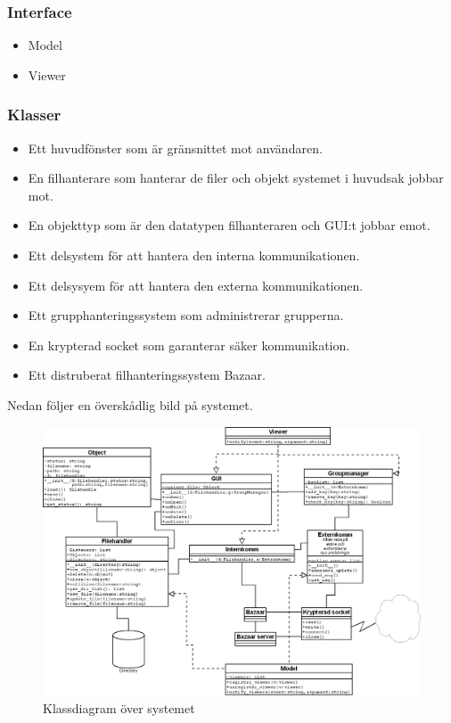 \subsubsection{Interface}
\begin{itemize}
\item Model
\item Viewer
\end{itemize}
\subsubsection{Klasser}
\begin{itemize}
\item Ett huvudfönster som är gränsnittet mot användaren.
\item En filhanterare som hanterar de filer och objekt systemet i huvudsak jobbar mot.
\item En objekttyp som är den datatypen filhanteraren och GUI:t jobbar emot.
\item Ett delsystem för att hantera den interna kommunikationen.
\item Ett delsysyem för att hantera den externa kommunikationen. 
\item Ett grupphanteringssystem som administrerar grupperna.
\item En krypterad socket som garanterar säker kommunikation.
\item Ett distruberat filhanteringssystem Bazaar.
\end{itemize}
Nedan följer en överskådlig bild på systemet.
 
\begin{figure}[ht]
  \centering
  \includegraphics[width=160mm]{klassdiagram.png}
  \caption{Klassdiagram över systemet}
  \label{fig1}
\end{figure}
\clearpage
